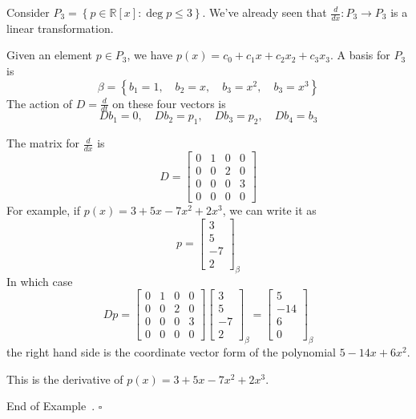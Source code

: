 \documentclass[10pt]{article}
\theoremstyle{definition}
\newtheorem{example}[theorem]{Example}
\renewenvironment{example}
{\begin{oldexample}}
  {\par\smallskip\hfill   End of Example~\theexample. $\square$    \par\end{oldexample}}
\newcommand{\R}{\mathbb{R}}           %
\begin{document}
\begin{example}[Differentiation]
  Consider $P_{3}= \left\{p\in \R[x]: \deg p \leq 3\right\} $. We've already
  seen that $\frac{d}{dx}: P_{3}\to P_{3}$ is a linear transformation.

  Given an element $p\in P_{3}$, we have $p(x)=
  c_{0}+c_{1}x+c_{2}x_{2}+c_{3}x_{3}$. A basis for $P_{3}$ is
  \begin{equation*}
    \beta= \left\{b_{1}= 1,\quad b_{2}=x, \quad b_{3}=x^{2}, \quad b_{3}=x^{3}\right\} 
  \end{equation*}
  The action of $D=\frac{d}{dt}$  on these four vectors is
  \begin{equation*}
    Db_{1} = 0, \quad Db_{2}=p_{1}, \quad Db_{3}=p_{2}, \quad Db_{4}=b_{3} 
  \end{equation*}

  The matrix for $\frac{d}{dx}$ is
  \begin{equation*}
    D=\begin{bmatrix}
      0&1&0&0\\
      0&0&2&0\\
      0&0&0&3\\
      0&0&0&0
    \end{bmatrix}
  \end{equation*}
  For example, if $p(x)=3+5x-7x^{2}+2x^{3}$, we can write it as
  \begin{equation*}
    p =
    \begin{bmatrix}
      3\\5\\-7\\2
    \end{bmatrix}_{\beta}
  \end{equation*}
  In which case
  \begin{equation*}
    Dp =\begin{bmatrix}
      0&1&0&0\\
      0&0&2&0\\
      0&0&0&3\\
      0&0&0&0
    \end{bmatrix}
    \begin{bmatrix}
      3\\5\\-7\\2
    \end{bmatrix}_{\beta}
    =
    \begin{bmatrix}
      5\\-14\\6\\0
    \end{bmatrix}_{\beta}
  \end{equation*}
  the right hand side is the coordinate vector form of the polynomial $5-14x+6x^{2}$.

  This is the derivative of $p(x) = 3+5x-7x^{2}+2x^{3}$.
\end{example}
\end{document}
